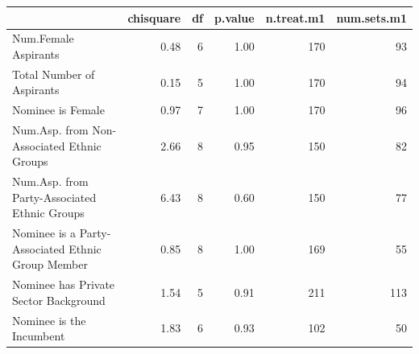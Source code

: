 \begin{table}[ht]
\centering
\label{tab:imbalance.pm}
\begin{tabular}{lrrrrr}
  \hline
 & chisquare & df & p.value & n.treat.m1 & num.sets.m1 \\ 
  \hline
Num.Female Aspirants & 0.48 & 6 & 1.00 & 170 & 93 \\ 
  Total Number of Aspirants & 0.15 & 5 & 1.00 & 170 & 94 \\ 
  Nominee is Female & 0.97 & 7 & 1.00 & 170 & 96 \\ 
  Num.Asp. from Non-Associated Ethnic Groups & 2.66 & 8 & 0.95 & 150 & 82 \\ 
  Num.Asp. from Party-Associated Ethnic Groups & 6.43 & 8 & 0.60 & 150 & 77 \\ 
  Nominee is a Party-Associated Ethnic Group Member & 0.85 & 8 & 1.00 & 169 & 55 \\ 
  Nominee has Private Sector Background & 1.54 & 5 & 0.91 & 211 & 113 \\ 
  Nominee is the Incumbent & 1.83 & 6 & 0.93 & 102 & 50 \\ 
   \hline
\end{tabular}
\end{table}

